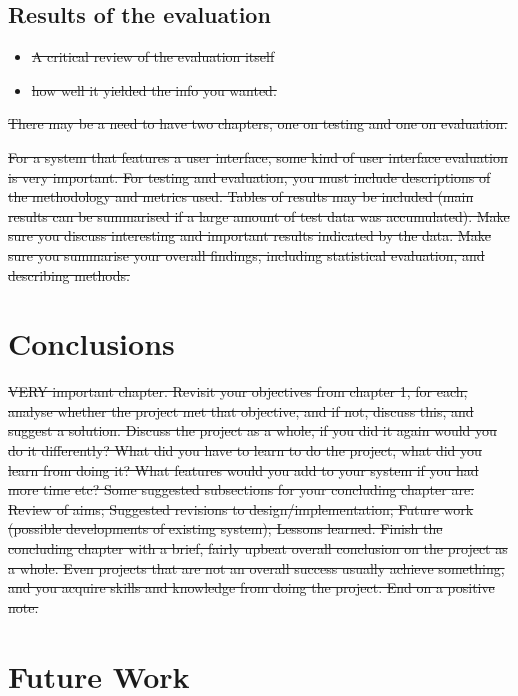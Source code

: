 \documentclass[12pt,a4paper,]{adreport}
\begin{document}
\section{Results of the evaluation}\label{results-of-the-evaluation}

\begin{itemize}
\itemsep1pt\parskip0pt
\item
  \sout{A critical review of the evaluation itself}
\item
  \sout{how well it yielded the info you wanted.}
\end{itemize}

\sout{There may be a need to have two chapters, one on testing and one
on evaluation.}

\sout{For a system that features a user interface, some kind of user
interface evaluation is very important. For testing and evaluation, you
must include descriptions of the methodology and metrics used. Tables of
results may be included (main results can be summarised if a large
amount of test data was accumulated). Make sure you discuss interesting
and important results indicated by the data. Make sure you summarise
your overall findings, including statistical evaluation, and describing
methods.}

\chapter{Conclusions}\label{conclusions}

\sout{VERY important chapter. Revisit your objectives from chapter 1,
for each, analyse whether the project met that objective, and if not,
discuss this, and suggest a solution. Discuss the project as a whole, if
you did it again would you do it differently? What did you have to learn
to do the project, what did you learn from doing it? What features would
you add to your system if you had more time etc? Some suggested
subsections for your concluding chapter are: Review of aims; Suggested
revisions to design/implementation; Future work (possible developments
of existing system); Lessons learned. Finish the concluding chapter with
a brief, fairly upbeat overall conclusion on the project as a whole.
Even projects that are not an overall success usually achieve something,
and you acquire skills and knowledge from doing the project. End on a
positive note.}

\chapter{Future Work}\label{future-work}
\end{document}
